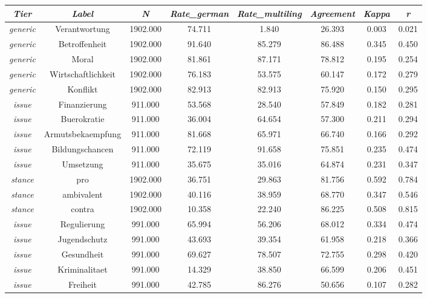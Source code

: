 \begin{tabular}{c c c c c c c c}
      \hline
      \textit{Tier} & \textit{Label} & \textit{N} & \textit{Rate\_german} & \textit{Rate\_multiling} & \textit{Agreement} & \textit{Kappa} & \textit{r} \\
      \hline
      \textit{generic} & Verantwortung & 1902.000 & 74.711 & 1.840 & 26.393 & 0.003 & 0.021 \\
      \textit{generic} & Betroffenheit & 1902.000 & 91.640 & 85.279 & 86.488 & 0.345 & 0.450 \\
      \textit{generic} & Moral & 1902.000 & 81.861 & 87.171 & 78.812 & 0.195 & 0.254 \\
      \textit{generic} & Wirtschaftlichkeit & 1902.000 & 76.183 & 53.575 & 60.147 & 0.172 & 0.279 \\
      \textit{generic} & Konflikt & 1902.000 & 82.913 & 82.913 & 75.920 & 0.150 & 0.295 \\
      \textit{issue} & Finanzierung & 911.000 & 53.568 & 28.540 & 57.849 & 0.182 & 0.281 \\
      \textit{issue} & Buerokratie & 911.000 & 36.004 & 64.654 & 57.300 & 0.211 & 0.294 \\
      \textit{issue} & Armutsbekaempfung & 911.000 & 81.668 & 65.971 & 66.740 & 0.166 & 0.292 \\
      \textit{issue} & Bildungschancen & 911.000 & 72.119 & 91.658 & 75.851 & 0.235 & 0.474 \\
      \textit{issue} & Umsetzung & 911.000 & 35.675 & 35.016 & 64.874 & 0.231 & 0.347 \\
      \textit{stance} & pro & 1902.000 & 36.751 & 29.863 & 81.756 & 0.592 & 0.784 \\
      \textit{stance} & ambivalent & 1902.000 & 40.116 & 38.959 & 68.770 & 0.347 & 0.546 \\
      \textit{stance} & contra & 1902.000 & 10.358 & 22.240 & 86.225 & 0.508 & 0.815 \\
      \textit{issue} & Regulierung & 991.000 & 65.994 & 56.206 & 68.012 & 0.334 & 0.474 \\
      \textit{issue} & Jugendschutz & 991.000 & 43.693 & 39.354 & 61.958 & 0.218 & 0.366 \\
      \textit{issue} & Gesundheit & 991.000 & 69.627 & 78.507 & 72.755 & 0.298 & 0.420 \\
      \textit{issue} & Kriminalitaet & 991.000 & 14.329 & 38.850 & 66.599 & 0.206 & 0.451 \\
      \textit{issue} & Freiheit & 991.000 & 42.785 & 86.276 & 50.656 & 0.107 & 0.282 \\
      \hline
    \end{tabular}